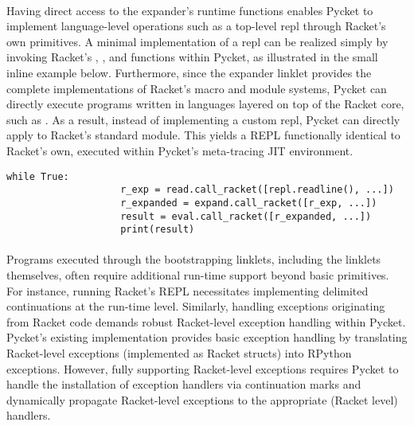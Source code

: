 			\paragraph{}%
				Having direct access to the expander's runtime functions enables Pycket to implement language-level operations such as a top-level \gls{repl} through Racket's own primitives. A minimal implementation of a \gls{repl} can be realized simply by invoking Racket's , , and  functions within Pycket, as illustrated in the small inline example below. Furthermore, since the expander linklet provides the complete implementations of Racket's macro and module systems, Pycket can directly execute programs written in languages layered on top of the Racket core, such as . As a result, instead of implementing a custom \gls{repl}, Pycket can directly apply  to Racket's standard  module. This yields a REPL functionally identical to Racket’s own, executed within Pycket’s meta-tracing JIT environment.

			\begin{center}
				\begin{minipage}{0.6\textwidth}
					\begin{lstlisting}[style=inline-python,frame=lines,numbers=none]
				while True:
					r_exp = read.call_racket([repl.readline(), ...])
					r_expanded = expand.call_racket([r_exp, ...])
					result = eval.call_racket([r_expanded, ...])
					print(result)\end{lstlisting}
				\end{minipage}
			\end{center}

			\paragraph{}%
				Programs executed through the bootstrapping linklets, including the linklets themselves, often require additional run-time support beyond basic primitives. For instance, running Racket's REPL necessitates implementing delimited continuations at the run-time level. Similarly, handling exceptions originating from Racket code demands robust Racket-level exception handling within Pycket. Pycket's existing implementation provides basic exception handling by translating Racket-level exceptions (implemented as Racket structs) into RPython exceptions. However, fully supporting Racket-level exceptions requires Pycket to handle the installation of exception handlers via continuation marks and dynamically propagate Racket-level exceptions to the appropriate (Racket level) handlers.

